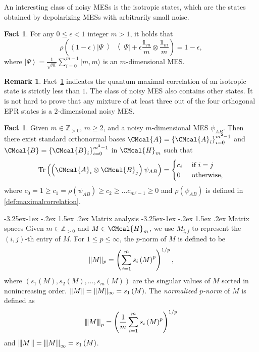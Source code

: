 \documentclass[11pt]{article}
\makeatletter
\renewcommand{\subsection}{\@startsection{subsection}{2}{\z@}%
             {-3.25ex\@plus -1ex \@minus -.2ex}%
             {1.5ex \@plus .2ex}%
             {\normalfont\large\scshape\bfseries}}
\renewcommand{\subsubsection}{\@startsection{subsubsection}{2}{\z@}%
             {-3.25ex\@plus -1ex \@minus -.2ex}%
             {1.5ex \@plus .2ex}%
             {\normalfont\normalsize\scshape\bfseries}}
\def\A{\CMcal{A}}
\def\B{\CMcal{B}}
\def\H{\CMcal{H}}
\theoremstyle{plain}
\theoremstyle{definition}
\newtheorem{remark}[theorem]{Remark}
\newtheorem{fact}[theorem]{Fact}
\newcommand {\set} [1] {\ensuremath{ \left\lbrace #1 \right\rbrace }}
\newcommand {\br} [1] {\ensuremath{ \left( #1 \right) }}
\DeclarePairedDelimiter{\norm}{\lVert}{\rVert}
\newcommand {\ket} [1] {\ensuremath{ \left| #1 \right\rangle }}
\newcommand {\ketbratwo} [2] {\ensuremath{ \left| #1 \middle\rangle \middle\langle #2 \right| }}
\newcommand {\ketbra} [1] {\ketbratwo{#1}{#1}}
\newcommand{\nnorm}[1]{{\left\vert\kern-0.25ex\left\vert\kern-0.25ex\left\vert #1
		\right\vert\kern-0.25ex\right\vert\kern-0.25ex\right\vert}}
\newcommand {\Tr} {\ensuremath{ \mathrm{Tr} }}
\newcommand {\id} {\ensuremath{\mathds{1}}}
\newcommand{\posint}{{\mathbb Z}_{>0}}
\newcommand{\1}{\mathbb{1}} %
\makeatother
\begin{document}
	An interesting class of noisy MESs is the isotropic states, which are the states obtained by depolarizing MESs with arbitrarily small noise.
	\begin{fact}\label{lem:noisyeprmaximalcorrelation}\cite[Lemma 3.9]{qin2021nonlocal}
		For any $0\leq\epsilon<1$ integer $m>1$, it holds that
		\[\rho\br{\br{1-\epsilon}\ketbra{\Psi}+\epsilon\frac{\id_{m}}{m}\otimes \frac{\id_{m}}{m}}=1-\epsilon,\]
		where $\ket{\Psi}=\frac{1}{\sqrt{m}}\sum_{i=0}^{m-1}|m,m\rangle$ is an $m$-dimensional MES.
	\end{fact}
 \begin{remark}
Fact~\ref{lem:noisyeprmaximalcorrelation} indicates the quantum maximal correlation of an isotropic state is strictly less than $1$. The class of noisy MES also contains other states. It is not hard to prove that any mixture of at least three out of the four orthogonal EPR states is a $2$-dimensional noisy MES.
 \end{remark}
	
	\begin{fact}\label{lem:normofM}\cite[Lemma 7.4]{qin2021nonlocal}
	Given $m\in\posint$, $m\geq2$, and a noisy $m$-dimensional MES $\psi_{AB}$. Then there exist standard orthonormal bases $\A=\set{\A_i}_{i=0}^{m^2-1}$ and $\B=\set{\B_i}_{i=0}^{m^2-1}$ in $\H_m$ such that
	\begin{equation}\label{eqn:corr}
\Tr\br{\br{\A_i\otimes\B_j}\psi_{AB}}=\begin{cases}c_i~&\mbox{if $i=j$}\\0~&\mbox{otherwise},\end{cases}
\end{equation}
where $c_0=1\geq c_1=\rho\br{\psi_{AB}}\geq c_2\geq\ldots c_{m^2-1}\geq0$ and $\rho\br{\psi_{AB}}$ is defined in \cref{def:maximalcorrelation}.
\end{fact}

\subsection{Matrix analysis}
\subsubsection{Matrix spaces}\label{}
Given $m\in\posint$ and $M\in\H_m$, we use $M_{i,j}$ to represent the $\br{i,j}$-th entry of $M$. For $1\leq p\leq\infty$, the $p$-norm of $M$ is defined to be \[\norm{M}_p=\br{\sum_{i=1}^{m}s_i\br{M}^p}^{1/p},\] where $\br{s_1\br{M},s_2\br{M},\ldots,s_m\br{M}}$ are the singular values of $M$ sorted in nonincreasing order. $\norm{M}=\norm{M}_{\infty}=s_1\br{M}$. 
The {\em normalized $p$-norm} of $M$ is defined as
\begin{equation}\label{eqn:nnormdef}
\nnorm{M}_p=\br{\frac{1}{m}\sum_{i=1}^ms_i\br{M}^p}^{1/p}
\end{equation}
 and $\nnorm{M}=\nnorm{M}_{\infty}=s_1\br{M}$. 
\end{document}
